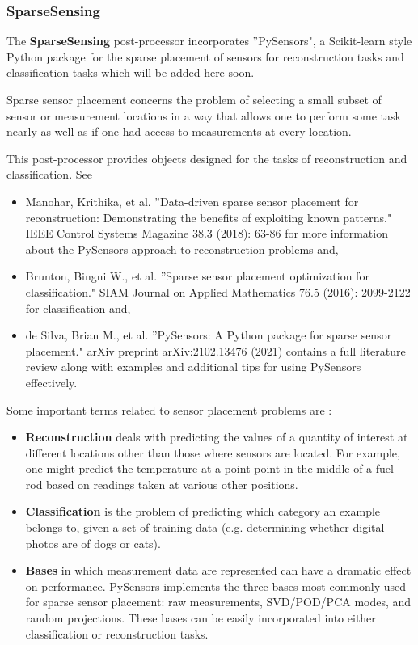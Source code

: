 \subsubsection{SparseSensing}
\label{SparseSensing}
The \textbf{SparseSensing} post-processor incorporates ''PySensors", a Scikit-learn style Python package for the sparse placement of sensors for reconstruction tasks and classification tasks which will be added here soon.

Sparse sensor placement concerns the problem of selecting a small subset of sensor or measurement locations in a way that allows one to perform some task nearly as well as if one had access to measurements at every location.

This post-processor provides objects designed for the tasks of reconstruction and classification. See

\begin{itemize}
    \item Manohar, Krithika, et al. ''Data-driven sparse sensor placement for reconstruction: Demonstrating the benefits of exploiting known patterns." IEEE Control Systems Magazine 38.3 (2018): 63-86 for more information about the PySensors approach to reconstruction problems and,
    \item Brunton, Bingni W., et al. ''Sparse sensor placement optimization for classification." SIAM Journal on Applied Mathematics 76.5 (2016): 2099-2122 for classification and,
    \item de Silva, Brian M., et al. ''PySensors: A Python package for sparse sensor placement." arXiv preprint arXiv:2102.13476 (2021) contains a full literature review along with examples and additional tips for using PySensors effectively.
\end{itemize} 

Some important terms related to sensor placement problems are : 

\begin{itemize}
    \item \textbf{Reconstruction} deals with predicting the values of a quantity of interest at different locations other than those where sensors are located. For example, one might predict the temperature at a point point in the middle of a fuel rod based on readings taken at various other positions. 

    \item \textbf{Classification} is the problem of predicting which category an example belongs to, given a set of training data (e.g. determining whether digital photos are of dogs or cats).

    \item \textbf{Bases} in which measurement data are represented can have a dramatic effect on performance. PySensors implements the three bases most commonly used for sparse sensor placement: raw measurements, SVD/POD/PCA modes, and random projections. These bases can be easily incorporated into either classification or reconstruction tasks. 
\end{itemize}

